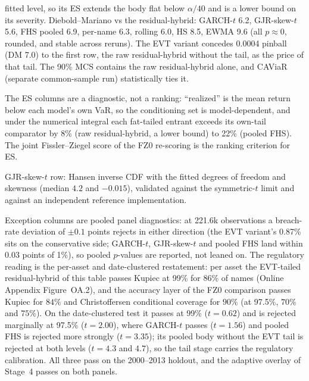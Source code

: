 \documentclass[11pt]{article}
\theoremstyle{remark}
\begin{document}
\begin{table}[t]
\begin{threeparttable}
\begin{tablenotes}
fitted level, so its ES extends the body flat below $\alpha/40$ and is a lower bound on its severity.
Diebold--Mariano vs the residual-hybrid: GARCH-$t$ 6.2, GJR-skew-$t$ 5.6,
FHS pooled 6.9, per-name 6.3, rolling 6.0, HS 8.5, EWMA 9.6 (all
$p\approx0$, rounded, and stable across reruns). The EVT variant
concedes 0.0004 pinball (DM 7.0) to the first row, the raw
residual-hybrid without the tail, as the price of that tail. The 90\% MCS contains the
raw residual-hybrid alone, and CAViaR (separate common-sample run)
statistically ties it.
\item The ES columns are a diagnostic, not a ranking:
``realized'' is the mean return below each model's own VaR, so
the conditioning set is model-dependent, and under the numerical integral
each fat-tailed entrant exceeds its own-tail comparator by 8\% (raw
residual-hybrid, a lower bound) to 22\% (pooled FHS).
The joint Fissler--Ziegel score of the FZ0 re-scoring is the ranking
criterion for ES.
\item GJR-skew-$t$ row: Hansen inverse CDF with the fitted
degrees of freedom and skewness (median $4.2$ and $-0.015$), validated against the
symmetric-$t$ limit and against an independent reference implementation.
\item Exception columns are pooled panel diagnostics: at 221.6k
observations a breach-rate deviation of $\pm0.1$ points rejects in
either direction (the EVT variant's 0.87\% sits on the conservative
side; GARCH-$t$, GJR-skew-$t$ and pooled FHS land within 0.03 points of 1\%), so pooled $p$-values are
reported, not leaned on. The regulatory reading is the per-asset and
date-clustered restatement: per asset the EVT-tailed residual-hybrid of this
table passes Kupiec at 99\% for $86\%$ of names (Online Appendix Figure~OA.2), and the accuracy layer of the
FZ0 comparison passes Kupiec for $84\%$ and Christoffersen conditional coverage for $90\%$ (at 97.5\%, $70\%$ and $75\%$). On the date-clustered test it passes at 99\% ($t=0.62$) and is rejected marginally at 97.5\% ($t=2.00$), where GARCH-$t$ passes ($t=1.56$) and pooled FHS is rejected more strongly ($t=3.35$); its pooled body without the EVT tail is rejected at both levels ($t=4.3$ and $4.7$), so the tail stage carries the regulatory
calibration. All three pass on the 2000--2013 holdout, and the adaptive overlay of Stage~4 passes on both panels.
\end{tablenotes}
\end{threeparttable}
\end{table}
\end{document}
